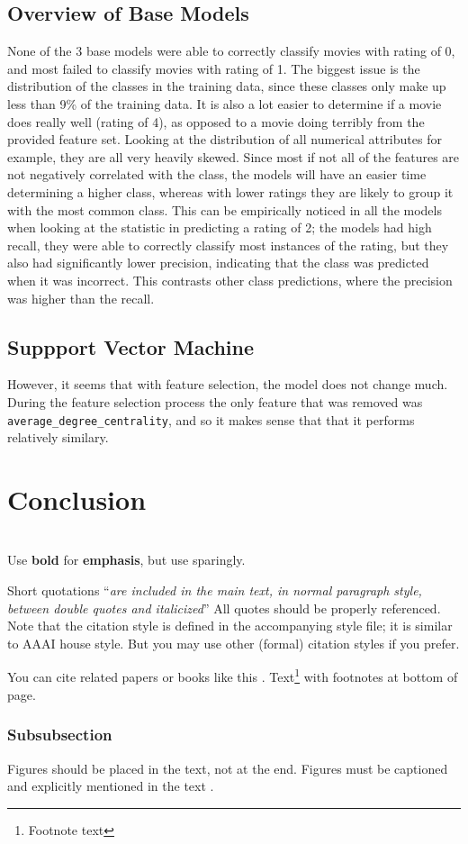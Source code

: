 \documentclass[11pt]{article}
\begin{document}
\subsection{Overview of Base Models}
None of the 3 base models were able to correctly classify movies with rating of 0, and most failed to classify movies with rating of 1. The biggest issue is the distribution of the classes in the training data, since these classes only make up less than 9\% of the training data. It is also a lot easier to determine if a movie does really well (rating of 4), as opposed to a movie doing terribly from the provided feature set. Looking at the distribution of all numerical attributes for example, they are all very heavily skewed. Since most if not all of the features are not negatively correlated with the class, the models will have an easier time determining a higher class, whereas with lower ratings they are likely to group it with the most common class. This can be empirically noticed in all the models when looking at the statistic in predicting a rating of 2; the models had high recall, they were able to correctly classify most instances of the rating, but they also had significantly lower precision, indicating that the class was predicted when it was incorrect. This contrasts other class predictions, where the precision was higher than the recall.

\subsection{Suppport Vector Machine}


However, it seems that with feature selection, the model does not change much. During the feature selection process the only feature that was removed was \texttt{average\_degree\_centrality}, and so it makes sense that that it performs relatively similary. 

\section{Conclusion}




\ \\ Use \textbf{bold} for \textbf{emphasis}, but use sparingly. 

Short quotations ``\textit{are included in the main text, in normal paragraph style, between double quotes and italicized}'' All quotes should be properly referenced. Note that the citation style is defined in the accompanying
style file; it is similar to AAAI house style. But you may use other (formal) citation styles if you prefer.

You can cite related papers or books like this \cite{bishop2006pattern}. Text\footnote{Footnote text} with footnotes at bottom of page.
\subsubsection{Subsubsection}

Figures should be placed in the text, not at the end. Figures must be captioned and explicitly mentioned in the text . 
\end{document}
